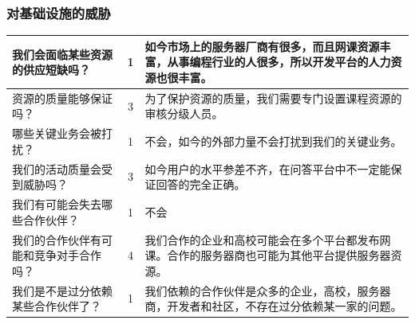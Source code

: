 \documentclass[a4paper]{ctexart}
\begin{document}
\subsubsection{对基础设施的威胁}
\begin{table}[h]
  \centering
\begin{tabular}{|p{3.5cm}|c|p{10cm}|}
  \hline
  我们会面临某些资源的供应短缺吗？ & 1 & 如今市场上的服务器厂商有很多，而且网课资源丰富，从事编程行业的人很多，所以开发平台的人力资源也很丰富。\\
  \hline
  资源的质量能够保证吗？ & 3 & 为了保护资源的质量，我们需要专门设置课程资源的审核分级人员。\\
  \hline
  哪些关键业务会被打扰？& 1 & 不会，如今的外部力量不会打扰到我们的关键业务。\\
  \hline
  我们的活动质量会受到威胁吗？& 3 & 如今用户的水平参差不齐，在问答平台中不一定能保证回答的完全正确。\\
  \hline
  我们有可能会失去哪些合作伙伴？& 1 & 不会\\
  \hline
  我们的合作伙伴有可能和竞争对手合作吗？& 4 & 我们合作的企业和高校可能会在多个平台都发布网课。合作的服务器商也可能为其他平台提供服务器资源。\\
  \hline
  我们是不是过分依赖某些合作伙伴了？& 1 & 我们依赖的合作伙伴是众多的企业，高校，服务器商，开发者和社区，不存在过分依赖某一家的问题。\\
  \hline
\end{tabular}
\end{table}







\FloatBarrier
\end{document}
